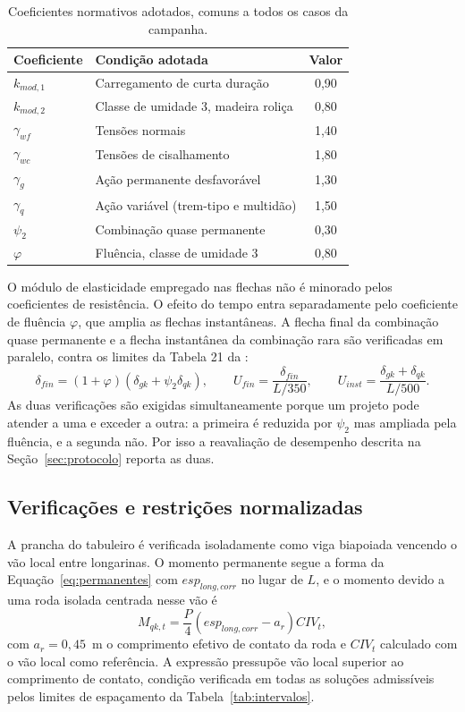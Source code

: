 \begin{table}[!ht]
\centering
\caption{Coeficientes normativos adotados, comuns a todos os casos da campanha.}
\label{tab:coeficientes}
\footnotesize
\begin{tabular}{llc}
\toprule
Coeficiente & Condição adotada & Valor \\
\midrule
$k_{mod,1}$ & Carregamento de curta duração & 0,90 \\
$k_{mod,2}$ & Classe de umidade 3, madeira roliça & 0,80 \\
$\gamma_{wf}$ & Tensões normais & 1,40 \\
$\gamma_{wc}$ & Tensões de cisalhamento & 1,80 \\
$\gamma_g$ & Ação permanente desfavorável & 1,30 \\
$\gamma_q$ & Ação variável (trem-tipo e multidão) & 1,50 \\
$\psi_2$ & Combinação quase permanente & 0,30 \\
$\varphi$ & Fluência, classe de umidade 3 & 0,80 \\
\bottomrule
\end{tabular}
\end{table}

O módulo de elasticidade empregado nas flechas não é minorado pelos coeficientes de resistência. O efeito do tempo entra separadamente pelo coeficiente de fluência $\varphi$, que amplia as flechas instantâneas. A flecha final da combinação quase permanente e a flecha instantânea da combinação rara são verificadas em paralelo, contra os limites da Tabela 21 da \textcite{NBR7190-1:2022}:
\begin{equation}
\delta_{fin}=(1+\varphi)\left(\delta_{gk}+\psi_2\delta_{qk}\right),\qquad
U_{fin}=\frac{\delta_{fin}}{L/350},\qquad
U_{inst}=\frac{\delta_{gk}+\delta_{qk}}{L/500}.
\label{eq:servico}
\end{equation}
As duas verificações são exigidas simultaneamente porque um projeto pode atender a uma e exceder a outra: a primeira é reduzida por $\psi_2$ mas ampliada pela fluência, e a segunda não. Por isso a reavaliação de desempenho descrita na Seção~\ref{sec:protocolo} reporta as duas.

\subsection{Verificações e restrições normalizadas}\label{sec:restricoes}

A prancha do tabuleiro é verificada isoladamente como viga biapoiada vencendo o vão local entre longarinas. O momento permanente segue a forma da Equação~\eqref{eq:permanentes} com $esp_{long,corr}$ no lugar de $L$, e o momento devido a uma roda isolada centrada nesse vão é
\begin{equation}
M_{qk,t}=\frac{P}{4}\left(esp_{long,corr}-a_r\right)CIV_t,
\label{eq:mqktab}
\end{equation}
com $a_r=0{,}45$~m o comprimento efetivo de contato da roda e $CIV_t$ calculado com o vão local como referência. A expressão pressupõe vão local superior ao comprimento de contato, condição verificada em todas as soluções admissíveis pelos limites de espaçamento da Tabela~\ref{tab:intervalos}.

